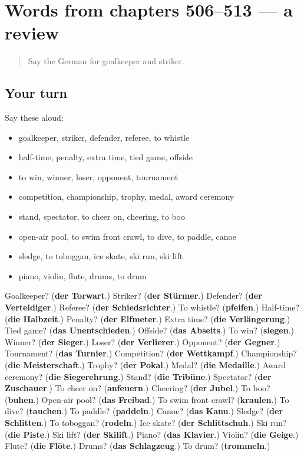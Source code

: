 \section[(dialogue)]{Words from chapters 506–513 — a review}

\label{lesson:GE-R513-review-506-513}



\begin{quote}
Say the German for goalkeeper and striker.
\end{quote}

\subsection*{Your turn}
Say these aloud:

\begin{itemize}
\raggedright
  \item goalkeeper, striker, defender, referee, to whistle
  \item half-time, penalty, extra time, tied game, offside
  \item to win, winner, loser, opponent, tournament
  \item competition, championship, trophy, medal, award ceremony
  \item stand, spectator, to cheer on, cheering, to boo
  \item open-air pool, to swim front crawl, to dive, to paddle, canoe
  \item sledge, to toboggan, ice skate, ski run, ski lift
  \item piano, violin, flute, drums, to drum
\end{itemize}

\begin{tcolorbox}[breakable,colback=teal!4,colframe=teal!35!black,title={Before you move on}]
Goalkeeper? (\textbf{der Torwart}.) Striker? (\textbf{der Stürmer}.) Defender? (\textbf{der Verteidiger}.) Referee? (\textbf{der Schiedsrichter}.) To whistle? (\textbf{pfeifen}.) Half-time? (\textbf{die Halbzeit}.) Penalty? (\textbf{der Elfmeter}.) Extra time? (\textbf{die Verlängerung}.) Tied game? (\textbf{das Unentschieden}.) Offside? (\textbf{das Abseits}.) To win? (\textbf{siegen}.) Winner? (\textbf{der Sieger}.) Loser? (\textbf{der Verlierer}.) Opponent? (\textbf{der Gegner}.) Tournament? (\textbf{das Turnier}.) Competition? (\textbf{der Wettkampf}.) Championship? (\textbf{die Meisterschaft}.) Trophy? (\textbf{der Pokal}.) Medal? (\textbf{die Medaille}.) Award ceremony? (\textbf{die Siegerehrung}.) Stand? (\textbf{die Tribüne}.) Spectator? (\textbf{der Zuschauer}.) To cheer on? (\textbf{anfeuern}.) Cheering? (\textbf{der Jubel}.) To boo? (\textbf{buhen}.) Open-air pool? (\textbf{das Freibad}.) To swim front crawl? (\textbf{kraulen}.) To dive? (\textbf{tauchen}.) To paddle? (\textbf{paddeln}.) Canoe? (\textbf{das Kanu}.) Sledge? (\textbf{der Schlitten}.) To toboggan? (\textbf{rodeln}.) Ice skate? (\textbf{der Schlittschuh}.) Ski run? (\textbf{die Piste}.) Ski lift? (\textbf{der Skilift}.) Piano? (\textbf{das Klavier}.) Violin? (\textbf{die Geige}.) Flute? (\textbf{die Flöte}.) Drums? (\textbf{das Schlagzeug}.) To drum? (\textbf{trommeln}.)
\end{tcolorbox}
